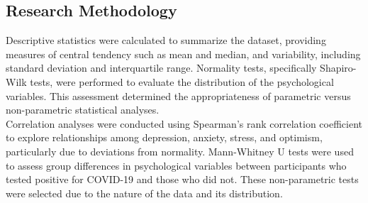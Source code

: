 \documentclass[a4paper]{article}
\begin{document}
\subsection{Research Methodology}
\vspace{0.5em}
Descriptive statistics were calculated to summarize the dataset, providing measures of central tendency such as mean and median, and variability, including standard deviation and interquartile range.
Normality tests, specifically Shapiro-Wilk tests, were performed to evaluate the distribution of the psychological variables. This assessment determined the appropriateness of parametric versus non-parametric statistical analyses.
\\
Correlation analyses were conducted using Spearman's rank correlation coefficient to explore relationships among depression, anxiety, stress, and optimism, particularly due to deviations from normality. Mann-Whitney U tests were used to assess group differences in psychological variables between participants who tested positive for COVID-19 and those who did not. These non-parametric tests were selected due to the nature of the data and its distribution.

\vspace{1em}
\end{document}
